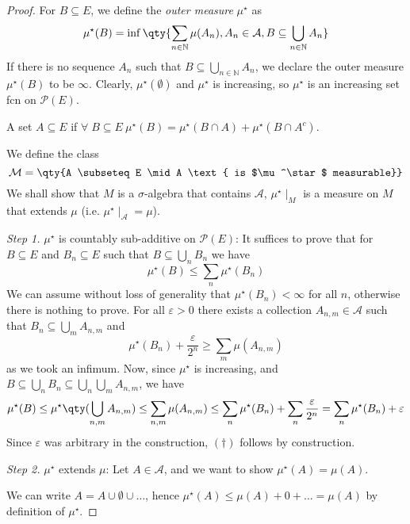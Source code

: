 \begin{proof}
	For $B \subseteq E$, we define the \emph{outer measure} $\mu^\star$ as
	\[ \mu^\star(B) = \inf \qty{\sum_{n \in \mathbb N} \mu(A_n), A_n \in \mathcal A, B \subseteq \bigcup_{n \in \mathbb N} A_n} \]
	If there is no sequence $A_n$ such that $B \subseteq \bigcup_{n \in \mathbb N} A_n$, we declare the outer measure $\mu^\star(B)$ to be $\infty$.
	Clearly, $\mu^\star(\emptyset)$ and $\mu^\star$ is increasing, so $\mu^\star$ is an increasing set fcn on $\mathcal{P}(E)$.

	\begin{definition}
		A set $A \subseteq E$  if $\forall \; B \subseteq E \ \mu^\star(B) = \mu^\star(B \cap A) + \mu^\star(B \cap A^c)$.
	\end{definition}

	We define the class
	\[ \mathcal M = \qty{A \subseteq E \mid A \text{ is $\mu^\star$ measurable}} \]
	We shall show that $M$ is a $\sigma$-algebra that contains $\mathcal{A}$, $\mu^\star \mid_M$ is a measure on $M$ that extends $\mu$ (i.e. $\mu^\star \mid_\mathcal{A} = \mu$).

	\emph{Step 1.} $\mu^\star$ is countably sub-additive on $\mathcal P(E)$:
	It suffices to prove that for $B \subseteq E$ and $B_n \subseteq E$ such that $B \subseteq \bigcup_n B_n$ we have
	\begin{equation}
		\mu^\star(B) \leq \sum_n \mu^\star(B_n)
		\tag{\(\dagger\)}
	\end{equation}
	We can assume without loss of generality that $\mu^\star(B_n) < \infty$ for all $n$, otherwise there is nothing to prove.
	For all $\varepsilon > 0$ there exists a collection $A_{n,m} \in \mathcal{A}$ such that $B_n \subseteq \bigcup_m A_{n,m}$ and
	\[ \mu^\star(B_n) + \frac{\varepsilon}{2^n} \geq \sum_m \mu(A_{n,m}) \]
	as we took an infimum.
	Now, since $\mu^\star$ is increasing, and $B \subseteq \bigcup_n B_n \subseteq \bigcup_n \bigcup_m A_{n,m}$, we have
	\[ \mu^\star(B) \leq \mu^\star\qty(\bigcup_{n,m} A_{n,m}) \leq \sum_{n,m} \mu(A_{n,m}) \leq \sum_n \mu^\star(B_n) + \sum_n \frac{\varepsilon}{2^n} = \sum_n \mu^\star(B_n) + \varepsilon \]
	Since $\varepsilon$ was arbitrary in the construction, $(\dagger)$ follows by construction.

	\emph{Step 2.} $\mu^\star$ extends $\mu$:
	Let $A \in \mathcal A$, and we want to show $\mu^\star(A) = \mu(A)$.

	We can write $A = A \cup \emptyset \cup \dots$, hence $\mu^\star(A) \leq \mu(A) + 0 + \dots = \mu(A)$ by definition of $\mu^\star$.


\end{proof}
